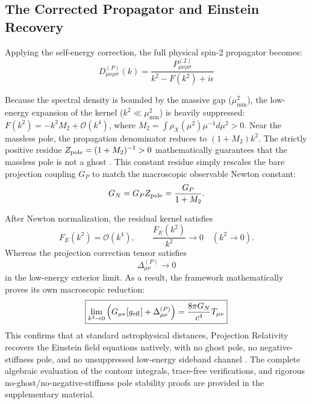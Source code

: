 \documentclass[11pt]{article}
\begin{document}
\subsection{The Corrected Propagator and Einstein Recovery}
\label{sec:corrected_propagator}

Applying the self-energy correction, the full physical spin-2 propagator becomes:
\begin{equation}
\boxed{ D_{\mu\nu\rho\sigma}^{(P)}(k) = \frac{P_{\mu\nu\rho\sigma}^{(2)}}{k^2 - F(k^2) + i\epsilon} }
\end{equation}

Because the spectral density is bounded by the massive gap ($\mu_{\min}^2$), the low-energy expansion of the kernel ($k^2 \ll \mu_{\min}^2$) is heavily suppressed: $F(k^2) = -k^2 M_2 + \mathcal{O}(k^4)$, where $M_2 = \int \rho_X(\mu^2) \mu^{-4} d\mu^2 > 0$. Near the massless pole, the propagation denominator reduces to $(1 + M_2)k^2$. The strictly positive residue $Z_{\rm pole} = (1 + M_2)^{-1} > 0$ mathematically guarantees that the massless pole is not a ghost \cite{Stelle1977}. This constant residue simply rescales the bare projection coupling $G_P$ to match the macroscopic observable Newton \cite{newton1687} constant:
\begin{equation}
G_N = G_P Z_{\rm pole} = \frac{G_P}{1 + M_2}.
\end{equation}

After Newton normalization, the residual kernel satisfies
\begin{equation}
F_E(k^2)=\mathcal O(k^4),
\qquad
\frac{F_E(k^2)}{k^2}\rightarrow0
\quad
(k^2\rightarrow0).
\end{equation}
Whereas the projection correction tensor satisfies
\begin{equation}
\Delta_{\mu\nu}^{(P)}\rightarrow0
\end{equation}
in the low-energy exterior limit. As a result, the framework mathematically proves its own macroscopic reduction:
\begin{equation}
\boxed{
\lim_{k^2 \to 0} \left( G_{\mu\nu}[g_{\rm eff}] + \Delta_{\mu\nu}^{(P)} \right) = \frac{8\pi G_N}{c^4} T_{\mu\nu}}
\end{equation}
This confirms that at standard astrophysical distances, Projection Relativity recovers the Einstein field equations natively, with no ghost pole, no negative-stiffness pole, and no unsuppressed low-energy sideband channel \cite{Donoghue1994}. The complete algebraic evaluation of the contour integrals, trace-free verifications, and rigorous no-ghost/no-negative-stiffness pole stability proofs are provided in the supplementary material.
\end{document}

